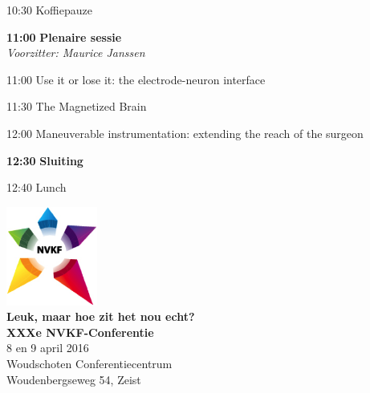 \documentclass[a4paper,10pt]{report}
\begin{document}
\begin{multicols*}{3}

\begin{packed_enum}
\item[{\color{Blue}{\textbf{09:00}}}]{ }
        \vfill
\item[10:30] Koffiepauze
        \vfill
\item[\textbf{11:00}] {\textbf{Plenaire sessie}}\\\textit{Voorzitter: Maurice Janssen}
\item[11:00] Use it or lose it: the electrode-neuron interface
\item[11:30] The Magnetized Brain
\item[12:00] Maneuverable instrumentation: extending the reach of the surgeon
        \vfill
\item[\textbf{12:30}] \textbf{Sluiting}
\vfill
\item[12:40] Lunch
\end{packed_enum}%


\columnbreak
\noindent
\begin{center}
\includegraphics[width=3cm]{nvkf_logo}\\
{\bfseries Leuk, maar hoe zit het nou echt?}\\ \vspace{0.15cm} 
{\bfseries XXXe NVKF-Conferentie}\\ \vspace{0.15cm}
{8 en 9 april 2016}\\ \vspace{0.15cm}
{Woudschoten Conferentiecentrum}\\
{Woudenbergseweg 54, Zeist}
\end{center}



\end{multicols*}
\end{document}
